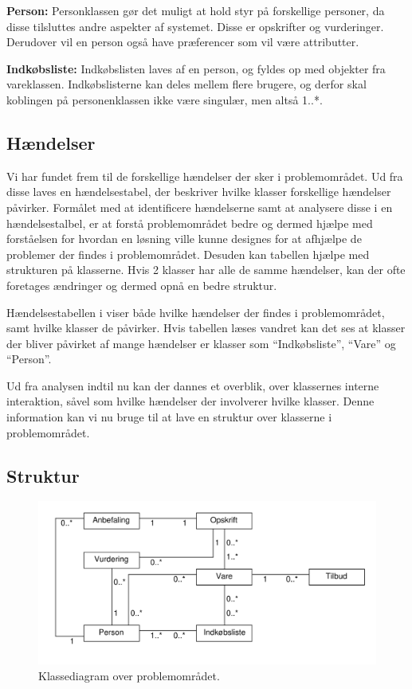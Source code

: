 \textbf{Person:}
Personklassen gør det muligt at hold styr på forskellige personer, da disse tilsluttes andre aspekter af systemet.
Disse er opskrifter og vurderinger. 
Derudover vil en person også have præferencer som vil være attributter. 

\textbf{Indkøbsliste:}
Indkøbslisten laves af en person, og fyldes op med objekter fra vareklassen.
Indkøbslisterne kan deles mellem flere brugere, og derfor skal koblingen på personenklassen ikke være singulær, men altså 1..*.

\subsection{Hændelser}
Vi har fundet frem til de forskellige hændelser der sker i problemområdet.
Ud fra disse laves en hændelsestabel, der beskriver hvilke klasser forskellige hændelser påvirker.
Formålet med at identificere hændelserne samt at analysere disse i en hændelsestalbel, er at forstå problemområdet bedre og dermed hjælpe med forståelsen for hvordan en løsning ville kunne designes for at afhjælpe de problemer der findes i problemområdet. Desuden kan tabellen hjælpe med strukturen på klasserne.
Hvis 2 klasser har alle de samme hændelser, kan der ofte foretages ændringer og dermed opnå en bedre struktur.



Hændelsestabellen i  viser både hvilke hændelser der findes i problemområdet, samt hvilke klasser de påvirker.
Hvis tabellen læses vandret kan det ses at klasser der bliver påvirket af mange hændelser er klasser som ``Indkøbsliste'', ``Vare'' og ``Person''.

Ud fra analysen indtil nu kan der dannes et overblik, over klassernes interne interaktion, såvel som hvilke hændelser der involverer hvilke klasser.
Denne information kan vi nu bruge til at lave en struktur over klasserne i problemområdet.

\subsection{Struktur}\label{sec:struktur}
\begin{figure}
	\centering
		\includegraphics[scale=0.6]{images/Diagrams/klassediagram_model_simple.pdf}
	\caption{Klassediagram over problemområdet.}
	\label{figur:PDklasse}
\end{figure}

